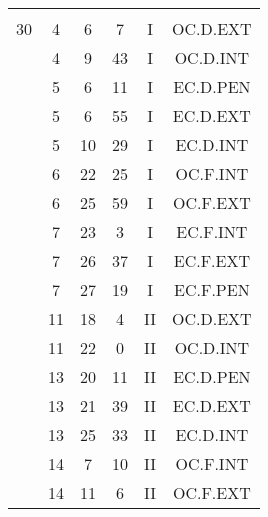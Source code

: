 \documentclass[12pt, a4paper]{article}
\begin{document}
\begin{multicols}{3}
{\begin{tabular}{c c c c c c}
	 	 	 	 & & & & & \\%
	 	 	 	30 & 4 & 6 & 7 & I & OC.D.EXT\\%
	 	 	 	 & 4 & 9 & 43 & I & OC.D.INT\\%
	 	 	 	 & 5 & 6 & 11 & I & EC.D.PEN\\%
	 	 	 	 & 5 & 6 & 55 & I & EC.D.EXT\\%
	 	 	 	 & 5 & 10 & 29 & I & EC.D.INT\\%
	 	 	 	 & 6 & 22 & 25 & I & OC.F.INT\\%
	 	 	 	 & 6 & 25 & 59 & I & OC.F.EXT\\%
	 	 	 	 & 7 & 23 & 3 & I & EC.F.INT\\%
	 	 	 	 & 7 & 26 & 37 & I & EC.F.EXT\\%
	 	 	 	 & 7 & 27 & 19 & I & EC.F.PEN\\%
	 	 	 	 & 11 & 18 & 4 & II & OC.D.EXT\\%
	 	 	 	 & 11 & 22 & 0 & II & OC.D.INT\\%
	 	 	 	 & 13 & 20 & 11 & II & EC.D.PEN\\%
	 	 	 	 & 13 & 21 & 39 & II & EC.D.EXT\\%
	 	 	 	 & 13 & 25 & 33 & II & EC.D.INT\\%
	 	 	 	 & 14 & 7 & 10 & II & OC.F.INT\\%
	 	 	 	 & 14 & 11 & 6 & II & OC.F.EXT\\%
	 	 \end{tabular}
 	}
\end{multicols}
\end{document}
